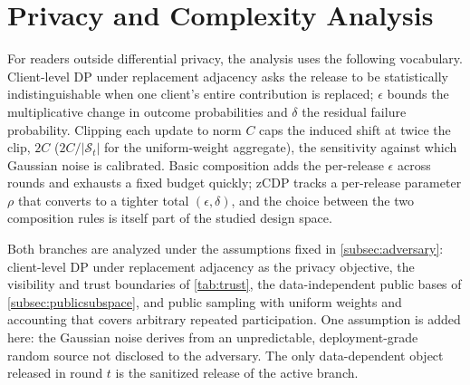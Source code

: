 \documentclass[a4paper,fleqn]{cas-dc}
\begin{document}
\section{Privacy and Complexity Analysis}
\label{sec:analysis}
\par
For readers outside differential privacy, the analysis uses the following vocabulary. Client-level DP under replacement adjacency asks the release to be statistically indistinguishable when one client's entire contribution is replaced; $\epsilon$ bounds the multiplicative change in outcome probabilities and $\delta$ the residual failure probability. Clipping each update to norm $C$ caps the induced shift at twice the clip, $2C$ ($2C/|\mathcal{S}_t|$ for the uniform-weight aggregate), the sensitivity against which Gaussian noise is calibrated. Basic composition adds the per-release $\epsilon$ across rounds and exhausts a fixed budget quickly; zCDP tracks a per-release parameter $\rho$ that converts to a tighter total $(\epsilon,\delta)$, and the choice between the two composition rules is itself part of the studied design space.
\par
Both branches are analyzed under the assumptions fixed in \cref{subsec:adversary}: client-level DP under replacement adjacency as the privacy objective, the visibility and trust boundaries of \cref{tab:trust}, the data-independent public bases of \cref{subsec:publicsubspace}, and public sampling with uniform weights and accounting that covers arbitrary repeated participation. One assumption is added here: the Gaussian noise derives from an unpredictable, deployment-grade random source not disclosed to the adversary. The only data-dependent object released in round $t$ is the sanitized release of the active branch.
\par
\end{document}
